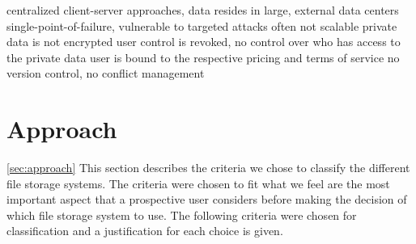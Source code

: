     centralized client-server approaches, data resides in large, external data centers
    single-point-of-failure, vulnerable to targeted attacks
    often not scalable
    private data is not encrypted
    user control is revoked, no control over who has access to the private data
    user is bound to the respective pricing and terms of service
    no version control, no conflict management

\section{Approach} %
\ref{sec:approach}
This section describes the criteria we chose to classify the different file storage systems. The criteria were chosen to fit what we feel are the most important aspect that a prospective user considers before making the decision of which file storage system to use. The following criteria were chosen for classification and a justification for each choice is given.

